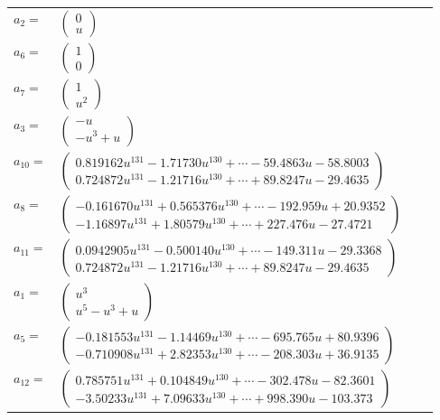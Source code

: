 \documentclass[1p]{elsarticle_modified}
\theoremstyle{definition}
\begin{document}
\begin{tabular}{m{7pt} m{180pt} m{7pt} m{180pt} }
\flushright $a_{2}=$&$\begin{pmatrix}0\\u\end{pmatrix}$ \\
\flushright $a_{6}=$&$\begin{pmatrix}1\\0\end{pmatrix}$ \\
\flushright $a_{7}=$&$\begin{pmatrix}1\\u^2\end{pmatrix}$ \\
\flushright $a_{3}=$&$\begin{pmatrix}- u\\- u^3+u\end{pmatrix}$ \\
\flushright $a_{10}=$&$\begin{pmatrix}0.819162 u^{131}-1.71730 u^{130}+\cdots-59.4863 u-58.8003\\0.724872 u^{131}-1.21716 u^{130}+\cdots+89.8247 u-29.4635\end{pmatrix}$ \\
\flushright $a_{8}=$&$\begin{pmatrix}-0.161670 u^{131}+0.565376 u^{130}+\cdots-192.959 u+20.9352\\-1.16897 u^{131}+1.80579 u^{130}+\cdots+227.476 u-27.4721\end{pmatrix}$ \\
\flushright $a_{11}=$&$\begin{pmatrix}0.0942905 u^{131}-0.500140 u^{130}+\cdots-149.311 u-29.3368\\0.724872 u^{131}-1.21716 u^{130}+\cdots+89.8247 u-29.4635\end{pmatrix}$ \\
\flushright $a_{1}=$&$\begin{pmatrix}u^3\\u^5- u^3+u\end{pmatrix}$ \\
\flushright $a_{5}=$&$\begin{pmatrix}-0.181553 u^{131}-1.14469 u^{130}+\cdots-695.765 u+80.9396\\-0.710908 u^{131}+2.82353 u^{130}+\cdots-208.303 u+36.9135\end{pmatrix}$ \\
\flushright $a_{12}=$&$\begin{pmatrix}0.785751 u^{131}+0.104849 u^{130}+\cdots-302.478 u-82.3601\\-3.50233 u^{131}+7.09633 u^{130}+\cdots+998.390 u-103.373\end{pmatrix}$ \\

\end{tabular}
\end{document}
